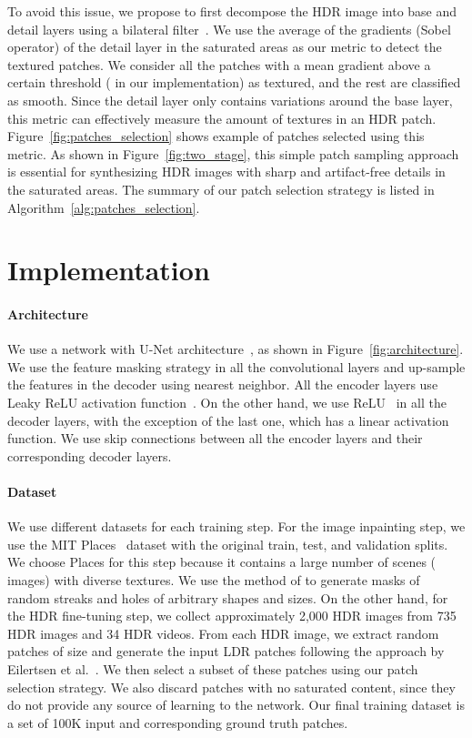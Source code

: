 To avoid this issue, we propose to first decompose the HDR image into base and detail layers using a bilateral filter~\cite{durand2002fast}. We use the average of the gradients (Sobel operator) of the detail layer in the saturated areas as our metric to detect the textured patches. We consider all the patches with a mean gradient above a certain threshold ( in our implementation) as textured, and the rest are classified as smooth. Since the detail layer only contains variations around the base layer, this metric can effectively measure the amount of textures in an HDR patch. Figure~\ref{fig:patches_selection} shows example of patches selected using this metric. As shown in Figure~\ref{fig:two_stage}, this simple patch sampling approach is essential for synthesizing HDR images with sharp and artifact-free details in the saturated areas. The summary of our patch selection strategy is listed in Algorithm~\ref{alg:patches_selection}.




\section{Implementation}
\label{sec:architecture}

\paragraph{Architecture}
We use a network with U-Net architecture~\cite{ronneberger2015u}, as shown in Figure~\ref{fig:architecture}. We use the feature masking strategy in all the convolutional layers and up-sample the features in the decoder using nearest neighbor. All the encoder layers use Leaky ReLU activation function~\cite{maas2013rectifier}. On the other hand, we use ReLU~\cite{nair2010rectified} in all the decoder layers, with the exception of the last one, which has a linear activation function. We use skip connections between all the encoder layers and their corresponding decoder layers.

\paragraph{Dataset}
We use different datasets for each training step. For the image inpainting step, we use the MIT Places~\cite{zhou2014learning} dataset with the original train, test, and validation splits. We choose Places for this step because it contains a large number of scenes ( images) with diverse textures. We use the method of \citet{liu2018image} to generate masks of random streaks and holes of arbitrary shapes and sizes. On the other hand, for the HDR fine-tuning step, we collect approximately 2,000 HDR images from 735 HDR images and 34 HDR videos. From each HDR image, we extract  random patches of size  and generate the input LDR patches following the approach by Eilertsen et al.~. We then select a subset of these patches using our patch selection strategy. We also discard patches with no saturated content, since they do not provide any source of learning to the network. Our final training dataset is a set of 100K input and corresponding ground truth patches.

